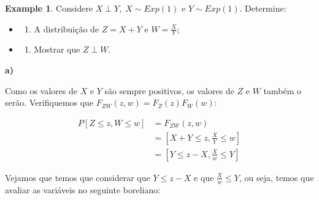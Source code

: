 \documentclass[
]{article}
\providecommand{\tightlist}{%
  \setlength{\itemsep}{0pt}\setlength{\parskip}{0pt}}
\theoremstyle{definition}
\theoremstyle{definition}
\newtheorem{example}{Example}[section]
\theoremstyle{definition}
\theoremstyle{definition}
\theoremstyle{remark}
\begin{document}
\begin{example}
\protect\hypertarget{exm:motivacaoexponencial}{}\label{exm:motivacaoexponencial}Considere \(X \perp Y, \; X \sim Exp(1)\) e \(Y \sim Exp(1)\). Determine:

\begin{itemize}
\item
  \begin{enumerate}
  \def\labelenumi{\alph{enumi})}
  \tightlist
  \item
    A distribuição de \(Z = X + Y\) e \(W = \frac{X}{Y}\);
  \end{enumerate}
\item
  \begin{enumerate}
  \def\labelenumi{\alph{enumi})}
  \setcounter{enumi}{1}
  \tightlist
  \item
    Mostrar que \(Z \perp W\).
  \end{enumerate}
\end{itemize}

\textbf{a)}

Como os valores de \(X\) e \(Y\) são sempre positivos, os valores de \(Z\) e \(W\) também o serão. Verifiquemos que \(F_{ZW}(z,w) = F_{Z}(z)F_{W}(w)\):

\begin{align*}
P[Z \le z, W \le w] &= F_{ZW}(z,w) \\
&= \left[X+Y \le z, \frac{X}{Y} \le w\right] \\
&= \left[Y \le z - X, \frac{X}{w} \le Y\right]
\end{align*}

Vejamos que temos que considerar que \(Y \le z-X\) e que \(\frac{X}{w} \le Y\), ou seja, temos que avaliar as variáveis no seguinte boreliano:

\begin{center}
\end{center}


\end{example}
\end{document}
